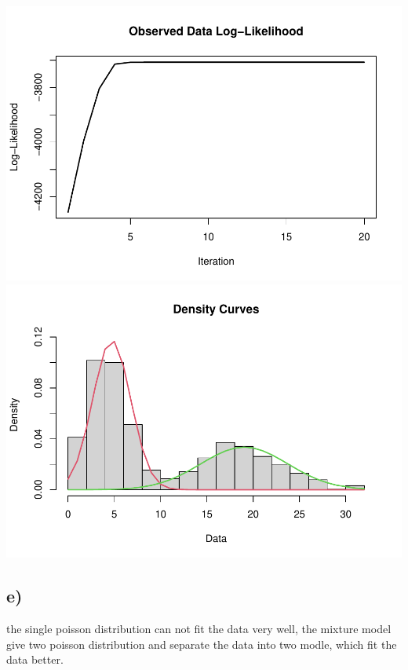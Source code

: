 \documentclass[
]{article}
\begin{document}
\includegraphics{539-hw3_files/figure-latex/unnamed-chunk-17-1.pdf}
\includegraphics{539-hw3_files/figure-latex/unnamed-chunk-17-2.pdf}

\hypertarget{e}{%
\subsection{e)}\label{e}}

the single poisson distribution can not fit the data very well, the
mixture model give two poisson distribution and separate the data into
two modle, which fit the data better.
\end{document}
